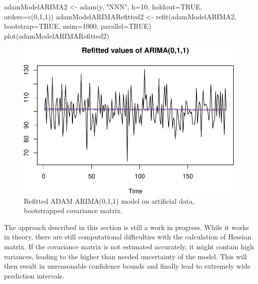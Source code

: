 \documentclass[
]{book}
\newenvironment{Shaded}{\begin{snugshade}}{\end{snugshade}}
\newcommand{\AttributeTok}[1]{\textcolor[rgb]{0.77,0.63,0.00}{#1}}
\newcommand{\ConstantTok}[1]{\textcolor[rgb]{0.00,0.00,0.00}{#1}}
\newcommand{\DecValTok}[1]{\textcolor[rgb]{0.00,0.00,0.81}{#1}}
\newcommand{\FunctionTok}[1]{\textcolor[rgb]{0.00,0.00,0.00}{#1}}
\newcommand{\NormalTok}[1]{#1}
\newcommand{\OtherTok}[1]{\textcolor[rgb]{0.56,0.35,0.01}{#1}}
\newcommand{\StringTok}[1]{\textcolor[rgb]{0.31,0.60,0.02}{#1}}
\theoremstyle{definition}
\theoremstyle{definition}
\theoremstyle{definition}
\theoremstyle{definition}
\theoremstyle{remark}
\begin{document}
\begin{Shaded}
\begin{Highlighting}[]
\NormalTok{adamModelARIMA2 }\OtherTok{\textless{}{-}} \FunctionTok{adam}\NormalTok{(y, }\StringTok{"NNN"}\NormalTok{, }\AttributeTok{h=}\DecValTok{10}\NormalTok{, }\AttributeTok{holdout=}\ConstantTok{TRUE}\NormalTok{,}
                       \AttributeTok{orders=}\FunctionTok{c}\NormalTok{(}\DecValTok{0}\NormalTok{,}\DecValTok{1}\NormalTok{,}\DecValTok{1}\NormalTok{))}
\NormalTok{adamModelARIMARefitted2 }\OtherTok{\textless{}{-}} \FunctionTok{refit}\NormalTok{(adamModelARIMA2, }\AttributeTok{bootstrap=}\ConstantTok{TRUE}\NormalTok{,}
                                \AttributeTok{nsim=}\DecValTok{1000}\NormalTok{, }\AttributeTok{parallel=}\ConstantTok{TRUE}\NormalTok{)}
\FunctionTok{plot}\NormalTok{(adamModelARIMARefitted2)}
\end{Highlighting}
\end{Shaded}

\begin{figure}
\centering
\includegraphics{adam_files/figure-latex/adamARIMARefitted200-1.pdf}
\caption{\label{fig:adamARIMARefitted200}Refitted ADAM ARIMA(0,1,1) model on artificial data, bootstrapped covariance matrix.}
\end{figure}

The approach described in this section is still a work in progress. While it works in theory, there are still computational difficulties with the calculation of Hessian matrix. If the covariance matrix is not estimated accurately, it might contain high variances, leading to the higher than needed uncertainty of the model. This will then result in unreasonable confidence bounds and finally lead to extremely wide prediction intervals.
\end{document}

